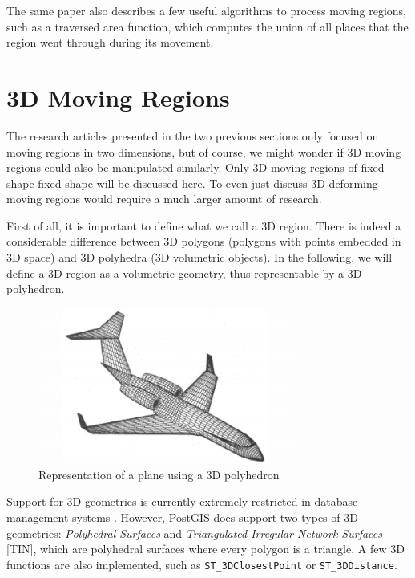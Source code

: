 The same paper \cite{fmregion} also describes a few useful algorithms to process moving regions, such as a traversed area function, which computes the union of all places that the region went through during its movement.

\section{3D Moving Regions}
\label{section:3d_regions_intro}

The research articles presented in the two previous sections only focused on moving regions in two dimensions, but of course, we might wonder if 3D moving regions could also be manipulated similarly. Only 3D moving regions of fixed shape fixed-shape will be discussed here. To even just discuss 3D deforming moving regions would require a much larger amount of research.

First of all, it is important to define what we call a 3D region. There is indeed a considerable difference between 3D polygons (polygons with points embedded in 3D space) and 3D polyhedra (3D volumetric objects). In the following, we will define a 3D region as a volumetric geometry, thus representable by a 3D polyhedron.

\begin{figure}[h!]
    \centering
    \includegraphics[width=0.75\textwidth]{images/plane_polyhedron.png}
    \caption[Representation of a plane using a 3D polyhedron]{Representation of a plane using a 3D polyhedron \cite{3d_polyhedron}}
    \label{fig:polyhedron}
\end{figure}


Support for 3D geometries is currently extremely restricted in database management systems \cite{3d_geom}. However, PostGIS does support two types of 3D geometries: \textit{Polyhedral Surfaces} and \textit{Triangulated Irregular Network Surfaces} [TIN], which are polyhedral surfaces where every polygon is a triangle. A few 3D functions are also implemented, such as \lstinline{ST_3DClosestPoint} or \lstinline{ST_3DDistance}.

